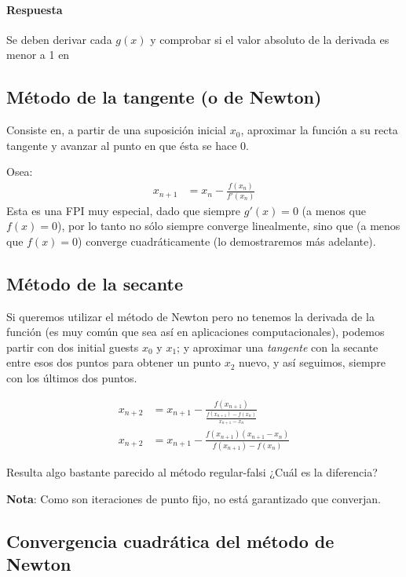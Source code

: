 \documentclass[spanish, fleqn]{article}
\begin{document}
\paragraph{Respuesta} Se deben derivar cada $g(x)$ y comprobar si el valor absoluto de la derivada es menor a 1 en

\subsection{Método de la tangente (o de Newton)}

Consiste en, a partir de una suposición inicial $x_0$, aproximar la función a su recta tangente y avanzar al punto en que ésta se hace $0$.

Osea:
\begin{align*}
x_{n+1} &= x_n-\frac{f(x_n)}{f'(x_n)}
\end{align*}
Esta es una FPI muy especial, dado que siempre $g'(x)=0$ (a menos que $f(x)=0$), por lo tanto no sólo siempre converge linealmente, sino que (a menos que $f(x)=0$) converge cuadráticamente (lo demostraremos más adelante).

\subsection{Método de la secante}

Si queremos utilizar el método de Newton pero no tenemos la derivada de la función (es muy común que sea así en aplicaciones computacionales), podemos partir con dos initial guests $x_0$ y $x_1$; y aproximar una \emph{tangente} con la secante entre esos dos puntos para obtener un punto $x_2$ nuevo, y así seguimos, siempre con los últimos dos puntos.

\begin{align*}
x_{n+2} &= x_{n+1}-\frac{f(x_{n+1})}{\frac{f(x_{n+1})-f(x_n)}{x_{n+1}-x_n}}
\\x_{n+2} &= x_{n+1}-\frac{f(x_{n+1})(x_{n+1}-x_n)}{f(x_{n+1})-f(x_n)}
\end{align*}

Resulta algo bastante parecido al método regular-falsi ¿Cuál es la diferencia?

\textbf{Nota}: Como son iteraciones de punto fijo, no está garantizado que converjan.


\subsection{Convergencia cuadrática del método de Newton}
\end{document}

